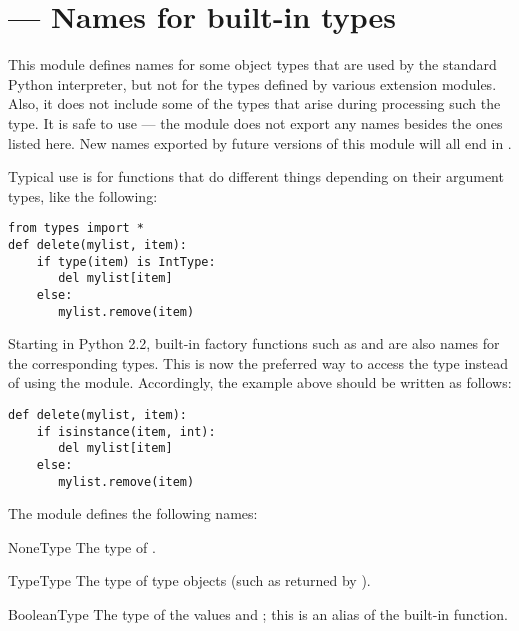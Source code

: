 \section{ ---
         Names for built-in types}



This module defines names for some object types that are used by
the standard Python interpreter, but not for the types defined by various
extension modules.  Also, it does not include some of the types that
arise during processing such the  type.
It is safe to use  ---
the module does not export any names besides the ones listed here.
New names exported by future versions of this module will all end in
.

Typical use is for functions that do different things depending on
their argument types, like the following:

\begin{verbatim}
from types import *
def delete(mylist, item):
    if type(item) is IntType:
       del mylist[item]
    else:
       mylist.remove(item)
\end{verbatim}

Starting in Python 2.2, built-in factory functions such as
 and  are also names for the
corresponding types.  This is now the preferred way to access
the type instead of using the  module.  Accordingly,
the example above should be written as follows:

\begin{verbatim}
def delete(mylist, item):
    if isinstance(item, int):
       del mylist[item]
    else:
       mylist.remove(item)
\end{verbatim}

The module defines the following names:

\begin{datadesc}{NoneType}
The type of .
\end{datadesc}

\begin{datadesc}{TypeType}
The type of type objects (such as returned by
).
\end{datadesc}

\begin{datadesc}{BooleanType}
The type of the  values  and ; this
is an alias of the built-in  function.
\end{datadesc}

